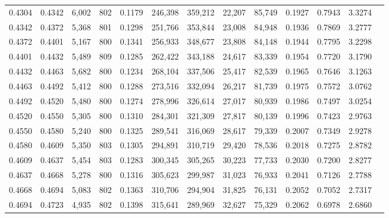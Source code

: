 \begin{tabular}{rrrrrrrrrrrrr}
0.4304 & 0.4342 &  6,002 & 802 &                                     0.1179 & 246,398 & 359,212 &  22,207 &  85,749 & 0.1927 & 0.7943 & 3.3274 \\
0.4342 & 0.4372 &  5,368 & 801 &                                     0.1298 & 251,766 & 353,844 &  23,008 &  84,948 & 0.1936 & 0.7869 & 3.2777 \\
0.4372 & 0.4401 &  5,167 & 800 &                                     0.1341 & 256,933 & 348,677 &  23,808 &  84,148 & 0.1944 & 0.7795 & 3.2298 \\
0.4401 & 0.4432 &  5,489 & 809 &                                     0.1285 & 262,422 & 343,188 &  24,617 &  83,339 & 0.1954 & 0.7720 & 3.1790 \\
0.4432 & 0.4463 &  5,682 & 800 &                                     0.1234 & 268,104 & 337,506 &  25,417 &  82,539 & 0.1965 & 0.7646 & 3.1263 \\
0.4463 & 0.4492 &  5,412 & 800 &                                     0.1288 & 273,516 & 332,094 &  26,217 &  81,739 & 0.1975 & 0.7572 & 3.0762 \\
0.4492 & 0.4520 &  5,480 & 800 &                                     0.1274 & 278,996 & 326,614 &  27,017 &  80,939 & 0.1986 & 0.7497 & 3.0254 \\
0.4520 & 0.4550 &  5,305 & 800 &                                     0.1310 & 284,301 & 321,309 &  27,817 &  80,139 & 0.1996 & 0.7423 & 2.9763 \\
0.4550 & 0.4580 &  5,240 & 800 &                                     0.1325 & 289,541 & 316,069 &  28,617 &  79,339 & 0.2007 & 0.7349 & 2.9278 \\
0.4580 & 0.4609 &  5,350 & 803 &                                     0.1305 & 294,891 & 310,719 &  29,420 &  78,536 & 0.2018 & 0.7275 & 2.8782 \\
0.4609 & 0.4637 &  5,454 & 803 &                                     0.1283 & 300,345 & 305,265 &  30,223 &  77,733 & 0.2030 & 0.7200 & 2.8277 \\
0.4637 & 0.4668 &  5,278 & 800 &                                     0.1316 & 305,623 & 299,987 &  31,023 &  76,933 & 0.2041 & 0.7126 & 2.7788 \\
0.4668 & 0.4694 &  5,083 & 802 &                                     0.1363 & 310,706 & 294,904 &  31,825 &  76,131 & 0.2052 & 0.7052 & 2.7317 \\
0.4694 & 0.4723 &  4,935 & 802 &                                     0.1398 & 315,641 & 289,969 &  32,627 &  75,329 & 0.2062 & 0.6978 & 2.6860 \\

\end{tabular}
